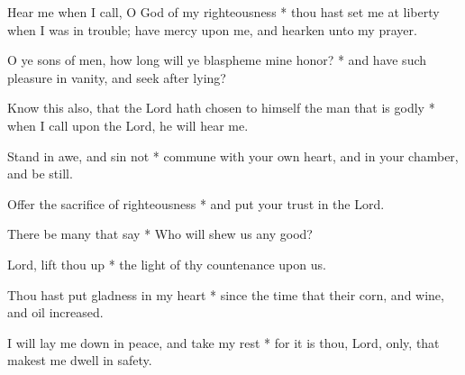 Hear me when I call, O God of my righteousness * thou hast set me at liberty when I was in trouble; have mercy upon me, and hearken unto my prayer.

O ye sons of men, how long will ye blaspheme mine honor? * and have such pleasure in vanity, and seek after lying?

Know this also, that the Lord hath chosen to himself the man that is godly * when I call upon the Lord, he will hear me.

Stand in awe, and sin not * commune with your own heart, and in your chamber, and be still.

Offer the sacrifice of righteousness * and put your trust in the Lord.

There be many that say * Who will shew us any good?

Lord, lift thou up * the light of thy countenance upon us.

Thou hast put gladness in my heart * since the time that their corn, and wine, and oil increased.

I will lay me down in peace, and take my rest * for it is thou, Lord, only, that makest me dwell in safety.
